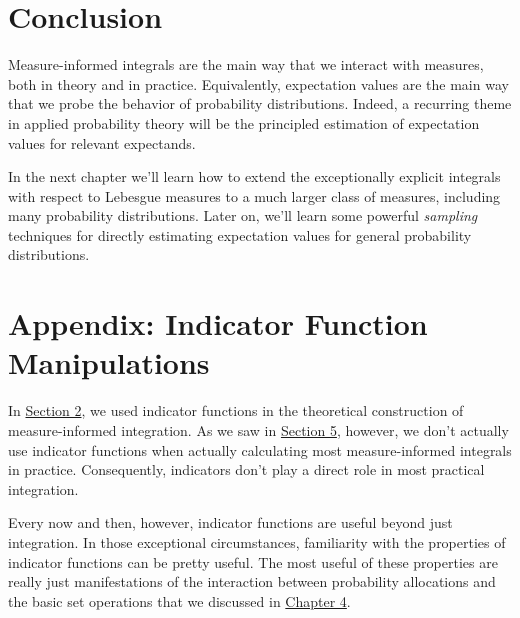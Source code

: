 \documentclass[
  letterpaper,
  DIV=11,
  numbers=noendperiod]{scrartcl}
\begin{document}
\section{Conclusion}\label{conclusion}

Measure-informed integrals are the main way that we interact with
measures, both in theory and in practice. Equivalently, expectation
values are the main way that we probe the behavior of probability
distributions. Indeed, a recurring theme in applied probability theory
will be the principled estimation of expectation values for relevant
expectands.

In the next chapter we'll learn how to extend the exceptionally explicit
integrals with respect to Lebesgue measures to a much larger class of
measures, including many probability distributions. Later on, we'll
learn some powerful \emph{sampling} techniques for directly estimating
expectation values for general probability distributions.

\section*{Appendix: Indicator Function Manipulations}\label{sec:app}

In \hyperref[sec:gen_int]{Section 2}, we used indicator functions in the
theoretical construction of measure-informed integration. As we saw in
\hyperref[sec:exp_int]{Section 5}, however, we don't actually use
indicator functions when actually calculating most measure-informed
integrals in practice. Consequently, indicators don't play a direct role
in most practical integration.

Every now and then, however, indicator functions are useful beyond just
integration. In those exceptional circumstances, familiarity with the
properties of indicator functions can be pretty useful. The most useful
of these properties are really just manifestations of the interaction
between probability allocations and the basic set operations that we
discussed in
\href{http://www.symplectomorphic.com/assets/chapters_html/probability_on_general_spaces.html\#derived-properties}{Chapter
4}.
\end{document}
